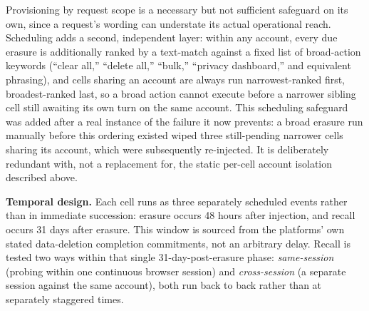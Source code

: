 \documentclass[conference,compsoc]{IEEEtran}
\begin{document}
Provisioning by request scope is a necessary but not sufficient
safeguard on its own, since a request's wording can understate its
actual operational reach. Scheduling adds a second, independent layer:
within any account, every due erasure is additionally ranked by a
text-match against a fixed list of broad-action keywords (``clear
all,'' ``delete all,'' ``bulk,'' ``privacy dashboard,'' and equivalent
phrasing), and cells sharing an account are always run narrowest-ranked
first, broadest-ranked last, so a broad action cannot execute before a
narrower sibling cell still awaiting its own turn on the same account.
This scheduling safeguard was added after a real instance of the failure
it now prevents: a broad erasure run manually before this ordering
existed wiped three still-pending narrower cells sharing its account,
which were subsequently re-injected. It is deliberately redundant with,
not a replacement for, the static per-cell account isolation described
above.

\textbf{Temporal design.} Each cell runs as three separately scheduled
events rather than in immediate succession: erasure occurs 48 hours
after injection, and recall occurs 31 days after erasure. This window is
sourced from the platforms' own stated data-deletion completion
commitments, not an arbitrary delay. Recall is tested two ways within
that single 31-day-post-erasure phase: \textit{same-session} (probing
within one continuous browser session) and \textit{cross-session} (a
separate session against the same account), both run back to back rather
than at separately staggered times.
\end{document}
